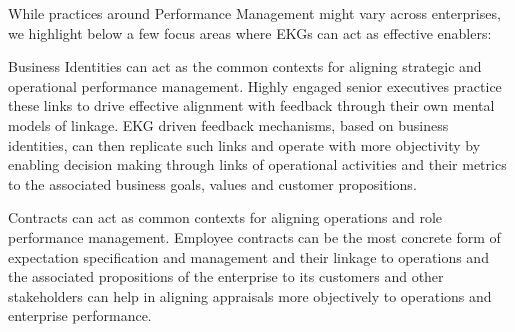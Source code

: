 %
%
While practices around Performance Management might vary across enterprises,
we highlight below a few focus areas where EKGs can act as effective enablers:

Business Identities can act as the common contexts for aligning strategic and operational performance management.
Highly engaged senior executives practice these links to drive effective alignment with feedback through their
own mental models of linkage.
EKG driven feedback mechanisms, based on business identities, can then replicate such links and operate with
more objectivity by enabling decision making through links of operational activities and their metrics to the
associated business goals, values and customer propositions.

Contracts can act as common contexts for aligning operations and role performance management.
Employee contracts can be the most concrete form of expectation specification and management and their
linkage to operations and the associated propositions of the enterprise to its customers and other
stakeholders can help in aligning appraisals more objectively to operations and enterprise performance.

